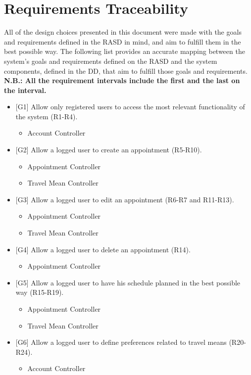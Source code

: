 \documentclass[12pt]{article}
\begin{document}
\section{Requirements Traceability}
All of the design choices presented in this document were made with the goals and requirements defined in the RASD in mind, and aim to fulfill them in the best possible way. The following list provides an accurate mapping between the system's goals and requirements defined on the RASD and the system components, defined in the DD, that aim to fulfill those goals and requirements.\\
\textbf{N.B.: All the requirement intervals include the first and the last on the interval.}
\begin{itemize}
    \item {[G1]} Allow only registered users to access the most relevant functionality of the system (R1-R4).
    \begin{itemize}
        \item Account Controller
    \end{itemize}
    \item {[G2]} Allow a logged user to create an appointment (R5-R10).
    \begin{itemize}
        \item Appointment Controller
        \item Travel Mean Controller
    \end{itemize}
    \item {[G3]} Allow a logged user to edit an appointment (R6-R7 and R11-R13).
    \begin{itemize}
        \item Appointment Controller
        \item Travel Mean Controller
    \end{itemize}
    \item {[G4]} Allow a logged user to delete an appointment (R14).
    \begin{itemize}
        \item Appointment Controller
    \end{itemize}
    \item {[G5]} Allow a logged user to have his schedule planned in the best possible way (R15-R19).
    \begin{itemize}
        \item Appointment Controller
        \item Travel Mean Controller
    \end{itemize}
    \item {[G6]} Allow a logged user to define preferences related to travel means (R20-R24).
    \begin{itemize}
        \item Account Controller
    \end{itemize}
\end{itemize}
\end{document}
